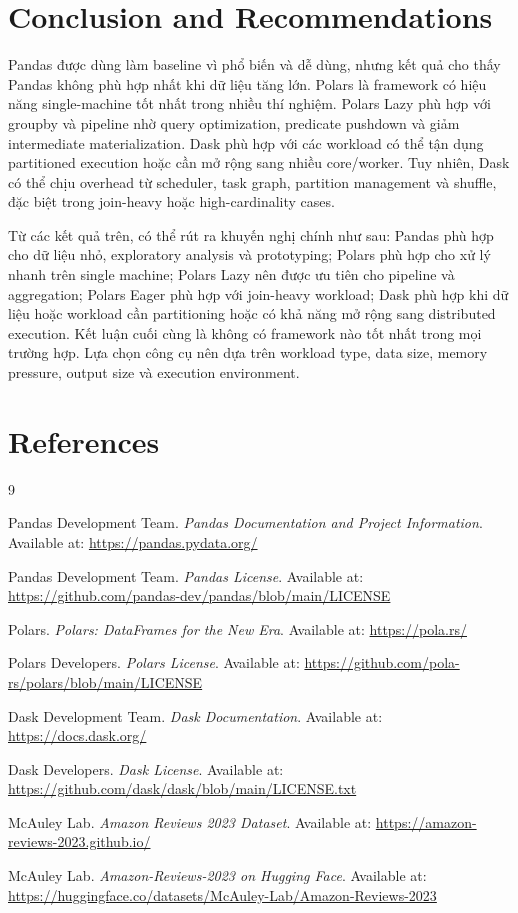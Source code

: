 \documentclass[12pt,a4paper]{article}
\begin{document}
\section{Conclusion and Recommendations}

 Pandas được dùng làm baseline vì phổ biến và dễ dùng, nhưng kết quả cho thấy Pandas không phù hợp nhất khi dữ liệu tăng lớn. Polars là framework có hiệu năng single-machine tốt nhất trong nhiều thí nghiệm. Polars Lazy phù hợp với groupby và pipeline nhờ query optimization, predicate pushdown và giảm intermediate materialization. Dask phù hợp với các workload có thể tận dụng partitioned execution hoặc cần mở rộng sang nhiều core/worker. Tuy nhiên, Dask có thể chịu overhead từ scheduler, task graph, partition management và shuffle, đặc biệt trong join-heavy hoặc high-cardinality cases.

Từ các kết quả trên, có thể rút ra khuyến nghị chính như sau: Pandas phù hợp cho dữ liệu nhỏ, exploratory analysis và prototyping; Polars phù hợp cho xử lý nhanh trên single machine; Polars Lazy nên được ưu tiên cho pipeline và aggregation; Polars Eager phù hợp với join-heavy workload; Dask phù hợp khi dữ liệu hoặc workload cần partitioning hoặc có khả năng mở rộng sang distributed execution. Kết luận cuối cùng là không có framework nào tốt nhất trong mọi trường hợp. Lựa chọn công cụ nên dựa trên workload type, data size, memory pressure, output size và execution environment.
\section*{References}

\begin{thebibliography}{9}

Pandas Development Team.
\textit{Pandas Documentation and Project Information}.
Available at: \url{https://pandas.pydata.org/}

Pandas Development Team.
\textit{Pandas License}.
Available at: \url{https://github.com/pandas-dev/pandas/blob/main/LICENSE}

Polars.
\textit{Polars: DataFrames for the New Era}.
Available at: \url{https://pola.rs/}

Polars Developers.
\textit{Polars License}.
Available at: \url{https://github.com/pola-rs/polars/blob/main/LICENSE}

Dask Development Team.
\textit{Dask Documentation}.
Available at: \url{https://docs.dask.org/}

Dask Developers.
\textit{Dask License}.
Available at: \url{https://github.com/dask/dask/blob/main/LICENSE.txt}

McAuley Lab.
\textit{Amazon Reviews 2023 Dataset}.
Available at: \url{https://amazon-reviews-2023.github.io/}

McAuley Lab.
\textit{Amazon-Reviews-2023 on Hugging Face}.
Available at: \url{https://huggingface.co/datasets/McAuley-Lab/Amazon-Reviews-2023}

\end{thebibliography}

\newpage
\appendix
\end{document}
